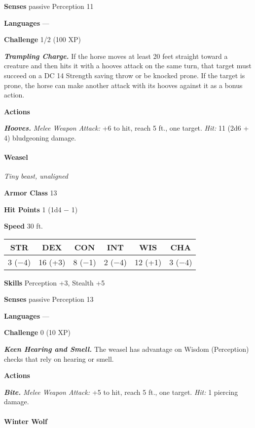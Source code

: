 \documentclass[
]{article}
\begin{document}
\textbf{Senses} passive Perception 11

\textbf{Languages} ---

\textbf{Challenge} 1/2 (100 XP)

\emph{\textbf{Trampling Charge.}} If the horse moves at least 20 feet
straight toward a creature and then hits it with a hooves attack on the
same turn, that target must succeed on a DC 14 Strength saving throw or
be knocked prone. If the target is prone, the horse can make another
attack with its hooves against it as a bonus action.

\textbf{Actions}

\emph{\textbf{Hooves.}} \emph{Melee Weapon Attack:} +6 to hit, reach 5
ft., one target. \emph{Hit:} 11 (2d6 + 4) bludgeoning damage.

\hypertarget{weasel}{%
\paragraph{Weasel}\label{weasel}}

\emph{Tiny beast, unaligned}

\textbf{Armor Class} 13

\textbf{Hit Points} 1 (1d4 − 1)

\textbf{Speed} 30 ft.

\begin{longtable}[]{@{}cccccc@{}}
\toprule
STR & DEX & CON & INT & WIS & CHA\tabularnewline
\midrule
\endhead
3 (−4) & 16 (+3) & 8 (−1) & 2 (−4) & 12 (+1) & 3 (−4)\tabularnewline
\bottomrule
\end{longtable}

\textbf{Skills} Perception +3, Stealth +5

\textbf{Senses} passive Perception 13

\textbf{Languages} ---

\textbf{Challenge} 0 (10 XP)

\emph{\textbf{Keen Hearing and Smell.}} The weasel has advantage on
Wisdom (Perception) checks that rely on hearing or smell.

\textbf{Actions}

\emph{\textbf{Bite.}} \emph{Melee Weapon Attack:} +5 to hit, reach 5
ft., one target. \emph{Hit:} 1 piercing damage.

\hypertarget{winter-wolf}{%
\paragraph{Winter Wolf}\label{winter-wolf}}
\end{document}
